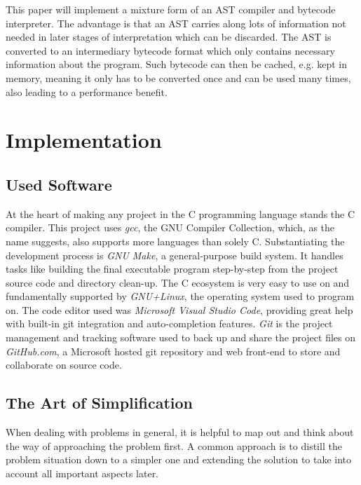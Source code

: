 \documentclass[12pt,a4paper]{article}
\begin{document}
This paper will implement a mixture form of an AST compiler and bytecode
interpreter. The advantage is that an AST carries along lots of information
not needed in later stages of interpretation which can be discarded. The AST
is converted to an intermediary bytecode format which only contains
necessary information about the program. Such bytecode can then be cached,
e.g. kept in memory, meaning it only has to be converted once and can be
used many times, also leading to a performance benefit.

\section{Implementation}
\subsection{Used Software}
At the heart of making any project in the C programming language
stands the C compiler. This project uses
\emph{gcc}, the GNU Compiler Collection, which, as the name suggests, also 
supports more languages than solely C. Substantiating the development process is 
\emph{GNU Make}, a general-purpose build system. It handles tasks like building
the final executable program step-by-step from the project source code and directory clean-up.
The C ecosystem is very easy to use on and fundamentally supported by 
\emph{GNU+Linux}, the operating system used to program on.
The code editor used was \emph{Microsoft Visual Studio Code}, providing great
help with built-in git integration and auto-completion features.
\emph{Git} is the project management and tracking software used to back up and share
the project files on \emph{GitHub.com}, a Microsoft hosted git repository and
web front-end to store and collaborate on source code.

\subsection{The Art of Simplification}
When dealing with problems in general, it is helpful to map out and think about
the way of approaching the problem first. A common approach is to distill the
problem situation down to a simpler one and extending the solution to take into
account all important aspects later.
\end{document}
